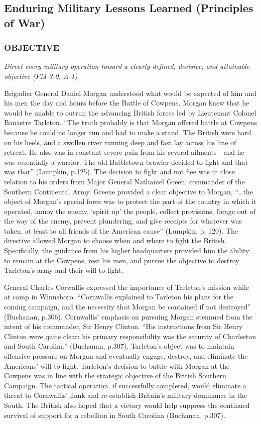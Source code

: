 \subsection{Enduring Military Lessons Learned (Principles of War)}

\subsubsection{OBJECTIVE}

\textit{Direct every military operation toward a clearly defined, decisive, and attainable objective (FM 3-0, A-1)}

Brigadier General Daniel Morgan understood what would be expected of him and
his men the day and hours before the Battle of Cowpens.  Morgan knew that he
would be unable to outrun the advancing British forces led by Lieutenant
Colonel Banastre Tarleton.  “The truth probably is that Morgan offered battle
at Cowpens because he could no longer run and had to make a stand.  The British
were hard on his heels, and a swollen river running deep and fast lay across
his line of retreat.  He also was in constant severe pain from his several
ailments—and he was essentially a warrior.  The old Battletown brawler decided
to fight and that was that” (Lumpkin, p.125).  The decision to fight and not
flee was in close relation to his orders from Major General Nathaniel Green,
commander of the Southern Continental Army.  Greene provided a clear objective
to Morgan, “…the object of Morgan’s special force was to protect the part of
the country in which it operated, annoy the enemy, ‘spirit up’ the people,
collect provisions, forage out of the way of the enemy, prevent plundering, and
give receipts for whatever was taken, at least to all friends of the American
cause” (Lumpkin, p. 120).  The directive allowed Morgan to choose when and
where to fight the British.  Specifically, the guidance from his higher
headquarters provided him the ability to remain at the Cowpens, rest his men,
and pursue the objective to destroy Tarleton’s army and their will to fight.  

General Charles Corwallis expressed the importance of Tarleton’s mission while
at camp in Winnsboro.  “Cornwallis explained to Tarleton his plans for the
coming campaign, and the necessity that Morgan be contained if not destroyed”
(Buchanan, p.306).  Cornwallis’ emphasis on pursuing Morgan stemmed from the
intent of his commander, Sir Henry Clinton.  “His instructions from Sir Henry
Clinton were quite clear: his primary responsibility was the security of
Charleston and South Carolina” (Buchanan, p.307).  Tarleton’s object was to
maintain offensive pressure on Morgan and eventually engage, destroy, and
eliminate the Americans’ will to fight.  Tarleton’s decision to battle with
Morgan at the Cowpens was in line with the strategic objective of the British
Southern Campaign.  The tactical operation, if successfully completed, would
eliminate a threat to Cornwallis’ flank and re-establish Britain’s military
dominance in the South.  The British also hoped that a victory would help
suppress the continued survival of support for a rebellion in South Carolina
(Buchanan, p.307).   

